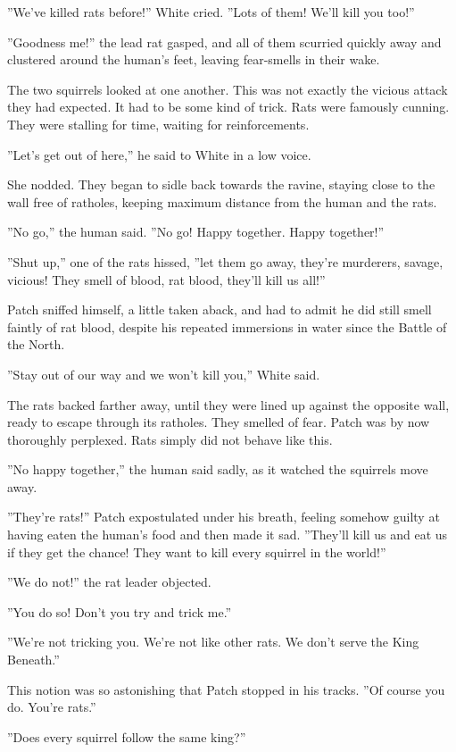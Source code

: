 \documentclass[12pt]{book}
\begin{document}
''We've killed rats before!'' White cried. ''Lots of them! We'll kill you too!''

''Goodness me!'' the lead rat gasped, and all of them scurried quickly away and clustered around the human's feet, leaving fear-smells in their wake.

The two squirrels looked at one another. This was not exactly the vicious attack they had expected. It had to be some kind of trick. Rats were famously cunning. They were stalling for time, waiting for reinforcements.

''Let's get out of here,'' he said to White in a low voice.

She nodded. They began to sidle back towards the ravine, staying close to the wall free of ratholes, keeping maximum distance from the human and the rats.

''No go,'' the human said. ''No go! Happy together. Happy together!''

''Shut up,'' one of the rats hissed, ''let them go away, they're murderers, savage, vicious! They smell of blood, rat blood, they'll kill us all!''

Patch sniffed himself, a little taken aback, and had to admit he did still smell faintly of rat blood, despite his repeated immersions in water since the Battle of the North.

''Stay out of our way and we won't kill you,'' White said.

The rats backed farther away, until they were lined up against the opposite wall, ready to escape through its ratholes. They smelled of fear. Patch was by now thoroughly perplexed. Rats simply did not behave like this.

''No happy together,'' the human said sadly, as it watched the squirrels move away.

''They're rats!'' Patch expostulated under his breath, feeling somehow guilty at having eaten the human's food and then made it sad. ''They'll kill us and eat us if they get the chance! They want to kill every squirrel in the world!''

''We do not!'' the rat leader objected.

''You do so! Don't you try and trick me.''

''We're not tricking you. We're not like other rats. We don't serve the King Beneath.''

This notion was so astonishing that Patch stopped in his tracks. ''Of course you do. You're rats.''

''Does every squirrel follow the same king?''
\end{document}
